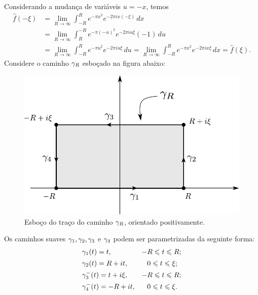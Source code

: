         Considerando a mudança de variáveis $u=-x$, temos
        \begin{align*}
            \widehat{f}(-\xi) 
            &=
            \lim_{R\to \infty} 
            \int_{-R}^{R} e^{ -\pi x^2  } e^{ -2\pi i x(-\xi) }\, dx
            \\[0.3cm]
            &=
            \lim_{R\to \infty} 
            \int_{R}^{-R} e^{ -\pi (-u)^2  } e^{ -2\pi i u\xi }(-1)\, du
            \\[0.3cm]
            &=
            \lim_{R\to \infty} 
            \int_{-R}^{R} e^{ -\pi u^2  } e^{ -2\pi i u\xi }\, du
            =
            \lim_{R\to \infty} 
            \int_{-R}^{R} e^{ -\pi x^2  } e^{ -2\pi i x\xi }\, dx
            =
            \widehat{f}(\xi).
        \end{align*}
        Considere o caminho $\gamma_{R}$  esboçado na figura abaixo:
        \begin{figure}[H]
            \centering
            \includegraphics[width=0.6\linewidth]{Figuras/caminho-gamaR-transf-Fourier-gaussiana.pdf}
            \caption{Esboço do traço do caminho $\gamma_{R}$, orientado positivamente.}
            \label{fig:cont-transf-fourier-gaussiana}
        \end{figure}
        Os caminhos suaves $\gamma_1,\gamma_2,\gamma_3$ e $\gamma_4$ podem ser parametrizadas da seguinte forma:
        \begin{equation*}
            \begin{array}{ll}
                \gamma_1(t) = t,				&-R\leqslant t\leqslant R;
                \\[0.15cm]
                \gamma_2(t) = R+it,				&\phantom{-}0\leqslant t\leqslant \xi;
                \\[0.15cm]
                \gamma_3^{-}(t) = t+i\xi,		&-R\leqslant t\leqslant R;
                \\[0.15cm]
                \gamma_4^{-}(t) = -R+it,		&\phantom{-}0\leqslant t\leqslant \xi.
            \end{array}
        \end{equation*}
